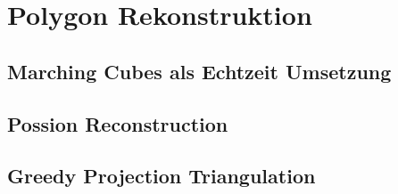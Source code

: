 \section{Polygon Rekonstruktion}

\subsection{Marching Cubes als Echtzeit Umsetzung}



\subsection{Possion Reconstruction}

\subsection{Greedy Projection Triangulation}

